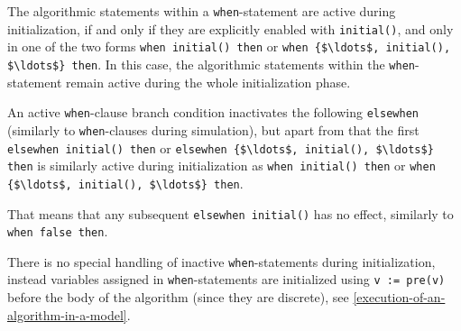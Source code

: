The algorithmic statements within a \lstinline!when!-statement are active during initialization, if and only if they are explicitly enabled with \lstinline!initial()!, and only in one of the two forms \lstinline!when initial() then! or \lstinline!when {$\ldots$, initial(), $\ldots$} then!.
In this case, the algorithmic statements within the \lstinline!when!-statement remain active during the whole initialization phase.

An active \lstinline!when!-clause branch condition inactivates the following \lstinline!elsewhen! (similarly to \lstinline!when!-clauses during simulation), but apart from that the first \lstinline!elsewhen initial() then! or \lstinline!elsewhen {$\ldots$, initial(), $\ldots$} then! is similarly active during initialization as \lstinline!when initial() then! or \lstinline!when {$\ldots$, initial(), $\ldots$} then!.

\begin{nonnormative}
That means that any subsequent \lstinline!elsewhen initial()! has no effect, similarly to \lstinline!when false then!.
\end{nonnormative}

\begin{nonnormative}
There is no special handling of inactive \lstinline!when!-statements during initialization, instead variables assigned in \lstinline!when!-statements are initialized using \lstinline!v := pre(v)! before the body of the algorithm (since they are discrete), see \cref{execution-of-an-algorithm-in-a-model}.
\end{nonnormative}

